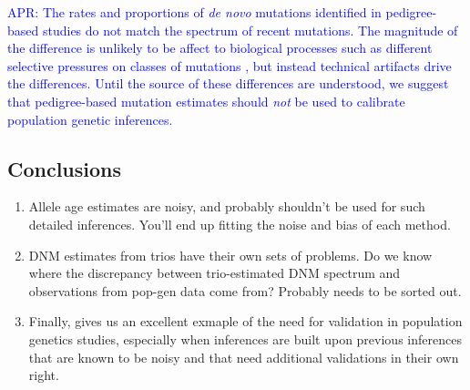 \documentclass[]{article}
\newcommand{\aprcomment}[1]{{\textcolor{blue}{APR: #1}}}
\begin{document}
\aprcomment{
    The rates and proportions of \emph{de novo} mutations identified in
    pedigree-based studies do not match the spectrum of recent mutations. The
    magnitude of the difference is unlikely to be affect to biological
    processes such as different selective pressures on classes of mutations
    \cite{gao2022limited}, but instead technical artifacts drive the
    differences.  Until the source of these differences are understood, we
    suggest that pedigree-based mutation estimates should \emph{not} be used to
    calibrate population genetic inferences.
}

\subsection*{Conclusions}

\begin{enumerate}
    \item Allele age estimates are noisy, and probably shouldn't be used
        for such detailed inferences. You'll end up fitting the noise and
        bias of each method.
    \item DNM estimates from trios have their own sets of problems. Do we
        know where the discrepancy between trio-estimated DNM spectrum and
        observations from pop-gen data come from? Probably needs to be
        sorted out.
    \item Finally, \citet{wang2023human} gives us an excellent exmaple of the
        need for validation in population genetics studies, especially when
        inferences are built upon previous inferences that are known to be
        noisy and that need additional validations in their own right.
\end{enumerate}



\end{document}
